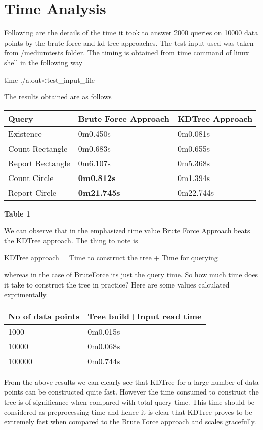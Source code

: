 \documentclass[11pt]{article}
\begin{document}
\section{Time Analysis}
Following are the details of the time it took to answer 2000 queries on 10000 data points by the brute-force and kd-tree approaches. The test input used was taken from /mediumtests folder. The timing is obtained from time command of linux shell in the following way
\begin{center}time ./a.out\textless test\_input\_file \end{center}
The results obtained are as follows
\begin{center}
    \begin{tabular}{| l | l | l |}
    \hline
    \textbf{Query} & \textbf{Brute Force Approach} & \textbf{KDTree Approach} \\ \hline
    Existence & 0m0.450s & 0m0.081s \\ \hline
    Count Rectangle & 0m0.683s & 0m0.655s \\ \hline
    Report Rectangle & 0m6.107s & 0m5.368s \\ \hline
    Count Circle & \textbf{0m0.812s} & 0m1.394s \\ \hline
    Report Circle & \textbf{0m21.745s} & 0m22.744s \\
    \hline
    \end{tabular}
\end{center}
\begin{center}\textbf{Table 1}\end{center}
We can observe that in the emphasized time value Brute Force Approach beats the KDTree approach. The thing to note is
\begin{center}KDTree approach = Time to construct the tree + Time for querying\end{center}
whereas in the case of BruteForce its just the query time. So how much time does it take to construct the tree in practice? Here are some values calculated exprimentally.
\begin{center}
    \begin{tabular}{| l | l |}
    \hline
    \textbf{No of data points} & \textbf{Tree build+Input read time}\\ \hline
    1000 & 0m0.015s\\ \hline
    10000 & 0m0.068s\\ \hline
    100000 & 0m0.744s\\
    \hline
    \end{tabular}
\end{center}
From the above results we can clearly see that KDTree for a large number of data points can be constructed quite fast. However the time consumed to construct the tree is of significance when compared with total query time. This time should be considered as preprocessing time and hence it is clear that KDTree proves to be extremely fast when compared to the Brute Force approach and scales gracefully. 
\end{document}

